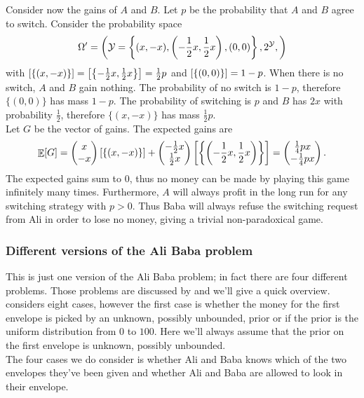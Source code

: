 \documentclass[twoside,a4paper]{article}
\theoremstyle{plain}
\theoremstyle{definition}
\theoremstyle{remark}
\numberwithin{equation}{section}
\let\P\relax
\DeclareMathOperator{\P}{\mathbb{P}}
\DeclareMathOperator{\E}{\mathbb{E}}
\DeclareMathOperator{\1}{\mathbbm{1}}
\newcommand{\Y}{\mathcal{Y}}
\begin{document}
Consider now the gains of $A$ and $B$. Let $p$ be the probability that $A$ and $B$ agree to switch. Consider the probability space
\[\Omega'=\left(\Y=\left\{(x,-x),\left(-\frac{1}{2}x,\frac{1}{2}x\right),(0,0)\right\},2^\Y,\P\right)\]
with $\P[\{(x,-x)\}]=\P\left[\left\{-\frac{1}{2}x,\frac{1}{2}x\right\}\right]=\frac{1}{2}p$ and $\P[\{(0,0)\}]=1-p$. When there is no switch, $A$ and $B$ gain nothing. The probability of no switch is $1-p$, therefore $\{(0,0)\}$ has mass $1-p$. The probability of switching is $p$ and $B$ has $2x$ with probability $\frac{1}{2}$, therefore $\{(x,-x)\}$ has mass $\frac{1}{2}p$.\\
Let $G$ be the vector of gains. The expected gains are
\begin{align*}
\E[G]=\begin{pmatrix}x\\-x\end{pmatrix}\P[\{(x,-x)\}]+\begin{pmatrix}-\frac{1}{2}x\\\frac{1}{2}x\end{pmatrix}\P\left[\left\{\left(-\frac{1}{2}x,\frac{1}{2}x\right)\right\}\right]=\begin{pmatrix}\frac{1}{4}px\\-\frac{1}{4}px\end{pmatrix}.
\end{align*}
The expected gains sum to $0$, thus no money can be made by playing this game infinitely many times. Furthermore, $A$ will always profit in the long run for any switching strategy with $p>0$. Thus Baba will always refuse the switching request from Ali in order to lose no money, giving a trivial non-paradoxical game.

\subsubsection{Different versions of the Ali Baba problem}
This is just one version of the Ali Baba problem; in fact there are four different problems. Those problems are discussed by \cite{Nickerson06} and we'll give a quick overview.\\
\cite{Nickerson06} considers eight cases, however the first case is whether the money for the first envelope is picked by an unknown, possibly unbounded, prior or if the prior is the uniform distribution from $0$ to $100$. Here we'll always assume that the prior on the first envelope is unknown, possibly unbounded.\\
The four cases we do consider is whether Ali and Baba knows which of the two envelopes they've been given and whether Ali and Baba are allowed to look in their envelope.
\end{document}
